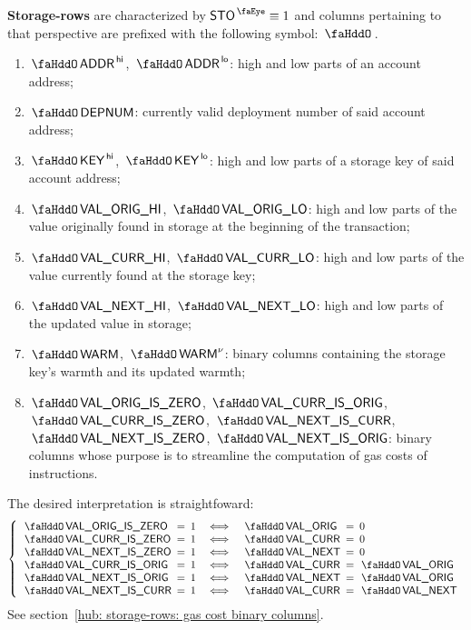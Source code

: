 \textbf{Storage-rows} are characterized by $\peekStorage \equiv 1$ and columns pertaining to that perspective are prefixed with the following symbol: $\storageSignifier$.
\begin{enumerate}
	\item $\stoAddressHi$, $\stoAddressLo$:
		high and low parts of an account address;
	\item $\stoDeploymentNumber$:
		currently valid deployment number of said account address;
	\item $\stoKeyHi$, $\stoKeyLo$:
		high and low parts of a storage key of said account address;
	\item $\stoOrigValueHi$, $\stoOrigValueLo$:
		high and low parts of the value originally found in storage at the beginning of the transaction;
	\item $\stoCurrValueHi$, $\stoCurrValueLo$:
		high and low parts of the value currently found at the storage key;
	\item $\stoNextValueHi$, $\stoNextValueLo$:
		high and low parts of the updated value in storage;
	\item $\stoWarmth$, $\stoWarmth\new$:
		binary columns containing the storage key's warmth and its updated warmth; 
	\item
		$\stoOrigValueIsZero$,
		$\stoCurrValueIsOrig$,
		$\stoCurrValueIsZero$,
		$\stoNextValueIsCurr$,
		$\stoNextValueIsZero$,
		$\stoNextValueIsOrig$:
		binary columns whose purpose is to streamline the computation of gas costs of  instructions.
\end{enumerate}
The desired interpretation is straightfoward:
\[
	\left\{ \begin{array}{lclclcl}
		\stoOrigValueIsZero & \!\!\! = \!\!\! & 1 & \iff & \stoOrigValue & \!\!\! = \!\!\! & 0           \\
		\stoCurrValueIsZero & \!\!\! = \!\!\! & 1 & \iff & \stoCurrValue & \!\!\! = \!\!\! & 0           \\
		\stoNextValueIsZero & \!\!\! = \!\!\! & 1 & \iff & \stoNextValue & \!\!\! = \!\!\! & 0           \\
		\stoCurrValueIsOrig & \!\!\! = \!\!\! & 1 & \iff & \stoCurrValue & \!\!\! = \!\!\! & \stoOrigValue \\
		\stoNextValueIsOrig & \!\!\! = \!\!\! & 1 & \iff & \stoNextValue & \!\!\! = \!\!\! & \stoOrigValue \\
		\stoNextValueIsCurr & \!\!\! = \!\!\! & 1 & \iff & \stoCurrValue & \!\!\! = \!\!\! & \stoNextValue \\
	\end{array} \right.
\]
See section~\ref{hub: storage-rows: gas cost binary columns}.

